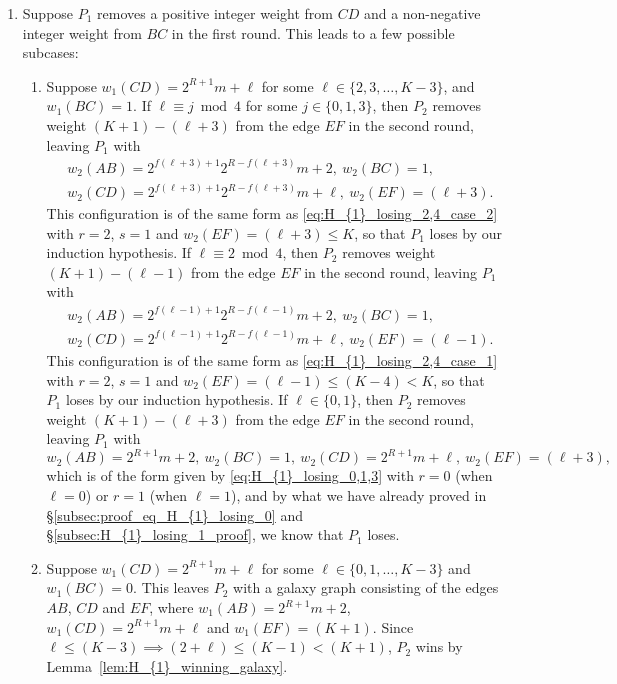 \documentclass[11pt,reqno]{amsart}
\theoremstyle{definition}
\theoremstyle{definition}
\begin{document}
\begin{enumerate}
\item Suppose $P_{1}$ removes a positive integer weight from $CD$ and a non-negative integer weight from $BC$ in the first round. This leads to a few possible subcases:
\begin{enumerate}
\item Suppose $w_{1}(CD)=2^{R+1}m+\ell$ for some $\ell \in \{2,3,\ldots,K-3\}$, and $w_{1}(BC)=1$. If $\ell \equiv j \bmod 4$ for some $j \in \{0,1,3\}$, then $P_{2}$ removes weight $(K+1)-(\ell+3)$ from the edge $EF$ in the second round, leaving $P_{1}$ with
\begin{align}
{}&w_{2}(AB)=2^{f(\ell+3)+1}2^{R-f(\ell+3)}m+2,\ w_{2}(BC)=1,\nonumber\\
{}&w_{2}(CD)=2^{f(\ell+3)+1}2^{R-f(\ell+3)}m+\ell,\ w_{2}(EF)=(\ell+3).\nonumber
\end{align}
This configuration is of the same form as \eqref{eq:H_{1}_losing_2,4_case_2} with $r=2$, $s=1$ and $w_{2}(EF)=(\ell+3)\leqslant K$, so that $P_{1}$ loses by our induction hypothesis. If $\ell\equiv 2 \bmod 4$, then $P_{2}$ removes weight $(K+1)-(\ell-1)$ from the edge $EF$ in the second round, leaving $P_{1}$ with
\begin{align}
{}&w_{2}(AB)=2^{f(\ell-1)+1}2^{R-f(\ell-1)}m+2,\ w_{2}(BC)=1,\nonumber\\
{}&w_{2}(CD)=2^{f(\ell-1)+1}2^{R-f(\ell-1)}m+\ell,\ w_{2}(EF)=(\ell-1).\nonumber
\end{align}
This configuration is of the same form as \eqref{eq:H_{1}_losing_2,4_case_1} with $r=2$, $s=1$ and $w_{2}(EF)=(\ell-1)\leqslant (K-4)<K$, so that $P_{1}$ loses by our induction hypothesis. If $\ell\in\{0,1\}$, then $P_{2}$ removes weight $(K+1)-(\ell+3)$ from the edge $EF$ in the second round, leaving $P_{1}$ with
\begin{equation}
w_{2}(AB)=2^{R+1}m+2,\ w_{2}(BC)=1,\ w_{2}(CD)=2^{R+1}m+\ell,\ w_{2}(EF)=(\ell+3),\nonumber
\end{equation}
which is of the form given by \eqref{eq:H_{1}_losing_0,1,3} with $r=0$ (when $\ell=0$) or $r=1$ (when $\ell=1$), and by what we have already proved in \S\ref{subsec:proof_eq_H_{1}_losing_0} and \S\ref{subsec:H_{1}_losing_1_proof}, we know that $P_{1}$ loses.

\item Suppose $w_{1}(CD)=2^{R+1}m+\ell$ for some $\ell \in \{0,1,\ldots,K-3\}$ and $w_{1}(BC)=0$. This leaves $P_{2}$ with a galaxy graph consisting of the edges $AB$, $CD$ and $EF$, where $w_{1}(AB)=2^{R+1}m+2$, $w_{1}(CD)=2^{R+1}m+\ell$ and $w_{1}(EF)=(K+1)$. Since $\ell\leqslant (K-3) \implies (2+\ell)\leqslant (K-1) < (K+1)$, $P_{2}$ wins by Lemma~\ref{lem:H_{1}_winning_galaxy}. 


\end{enumerate}
\end{enumerate}
\end{document}
